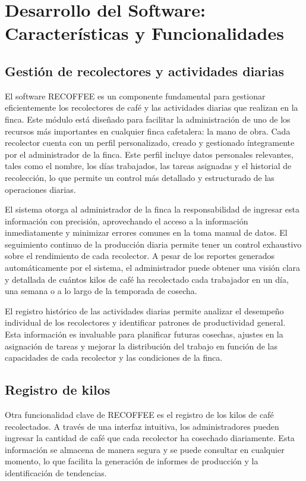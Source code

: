 \documentclass[12pt]{article}
\begin{document}
\section{Desarrollo del Software: Caracter\'isticas y Funcionalidades}
\subsection{Gesti\'on de recolectores y actividades diarias}

El software RECOFFEE es un componente fundamental para gestionar eficientemente los recolectores de caf\'e y las actividades diarias que realizan en la finca. Este m\'odulo est\'a dise\~nado para facilitar la administraci\'on de uno de los recursos m\'as importantes en cualquier finca cafetalera: la mano de obra. Cada recolector cuenta con un perfil personalizado, creado y gestionado \'integramente por el administrador de la finca. Este perfil incluye datos personales relevantes, tales como el nombre, los d\'ias trabajados, las tareas asignadas y el historial de recolecci\'on, lo que permite un control m\'as detallado y estructurado de las operaciones diarias.

El sistema otorga al administrador de la finca la responsabilidad de ingresar esta informaci\'on con precisi\'on, aprovechando el acceso a la informaci\'on inmediatamente y minimizar errores comunes en la toma manual de datos. El seguimiento continuo de la producci\'on diaria permite tener un control exhaustivo sobre el rendimiento de cada recolector. A pesar de los reportes generados autom\'aticamente por el sistema, el administrador puede obtener una visi\'on clara y detallada de cu\'antos kilos de caf\'e ha recolectado cada trabajador en un d\'ia, una semana o a lo largo de la temporada de cosecha.

El registro hist\'orico de las actividades diarias permite analizar el desempe\~no individual de los recolectores y identificar patrones de productividad general. Esta informaci\'on es invaluable para planificar futuras cosechas, ajustes en la asignaci\'on de tareas y mejorar la distribuci\'on del trabajo en funci\'on de las capacidades de cada recolector y las condiciones de la finca.

\subsection{Registro de kilos}

Otra funcionalidad clave de RECOFFEE es el registro de los kilos de caf\'e recolectados. A trav\'es de una interfaz intuitiva, los administradores pueden ingresar la cantidad de caf\'e que cada recolector ha cosechado diariamente. Esta informaci\'on se almacena de manera segura y se puede consultar en cualquier momento, lo que facilita la generaci\'on de informes de producci\'on y la identificaci\'on de tendencias.
\end{document}
